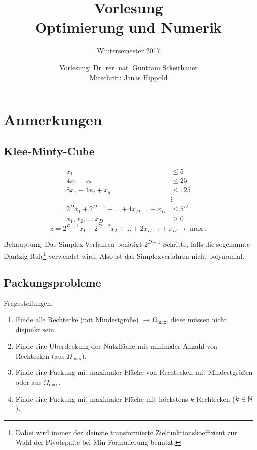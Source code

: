 \documentclass[
 a4paper,
 12pt,
 parskip=half
 ]{scrreprt}
\title{Vorlesung\\Optimierung und Numerik}
\subtitle{Wintersemester 2017}
\author{Vorlesung: Dr. rer. nat. Guntram Scheithauer\\Mitschrift: Jonas Hippold}
\theoremstyle{plain}
\theoremstyle{definition}
\numberwithin{rmrk}{chapter}
\numberwithin{defn}{chapter}
\numberwithin{exmp}{chapter}
\numberwithin{prgp}{subsection}
\numberwithin{thm}{chapter}
\numberwithin{equation}{chapter}
\begin{document}
\maketitle

\tableofcontents

\clearpage











\appendix
\chapter*{Anmerkungen}

\section*{Klee-Minty-Cube}
\begin{align*}
  x_1 &\le 5 \\
  4 x_1 + x_2 &\le 25 \\
  8 x_1 + 4 x_2 + x_5 &\le 125 \\
      &\vdots \\
  2^D x_1 + 2^{D-1} + \ldots + 4 x_{D-1} + x_D &\le 5^D \\
  x_1, x_2, \ldots, x_D &\ge 0
\end{align*}
\[ z = 2^{D-1} x_1 + 2^{D-2} x_2 + \ldots + 2 x_{D-1} + x_D \to \max. \]

Behauptung: Das Simplex-Verfahren benötigt $2^{D-1}$ Schritte, falls die
sogenannte Dantzig-Rule\footnote{%
  Dabei wird immer der kleinste transformierte Zielfunktionskoeffizient zur Wahl
  der Pivotspalte bei Min-Formulierung benutzt.
} verwendet wird. Also ist das Simplexverfahren nicht polynomial.

\section*{Packungsprobleme}
Fragestellungen:
\begin{enumerate}
\item Finde alle Rechtecke (mit Mindestgröße) $\to \Omega_{\max}$, diese müssen
  nicht disjunkt sein.
\item Finde eine Überdeckung der Nutzfläche mit minimaler Anzahl von Rechtecken
  (aus $\Omega_{\max}$).
\item Finde eine Packung mit maximaler Fläche von Rechtecken mit Mindestgrößen
  oder aus $\Omega_{\max}$.
\item Finde eine Packung mit maximaler Fläche mit höchstens $k$ Rechtecken ($k
  \in \mathbb{N}$).
\end{enumerate}
\end{document}
